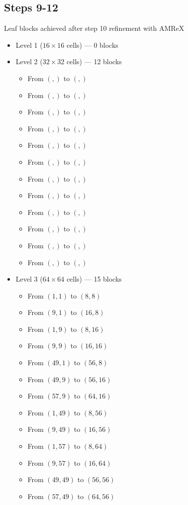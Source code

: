 \documentclass[12pt,letterpaper]{article}
\begin{document}
\subsection{Steps 9-12}
Leaf blocks achieved after step 10 refinement with AMReX
\begin{itemize}
\item{Level 1 ($16 \times 16$ cells) --- 0 blocks}
\item{Level 2 ($32 \times 32$ cells) --- 12 blocks}
    \begin{itemize}
    \item{From $(,)$ to $(,)$}
    \item{From $(,)$ to $(,)$}
    \item{From $(,)$ to $(,)$}
    \item{From $(,)$ to $(,)$}
    \item{From $(,)$ to $(,)$}
    \item{From $(,)$ to $(,)$}
    \item{From $(,)$ to $(,)$}
    \item{From $(,)$ to $(,)$}
    \item{From $(,)$ to $(,)$}
    \item{From $(,)$ to $(,)$}
    \item{From $(,)$ to $(,)$}
    \item{From $(,)$ to $(,)$}
    \end{itemize}
\item{Level 3 ($64 \times 64$ cells) --- 15 blocks}
    \begin{itemize}
    \item{From $(1, 1)$ to $( 8, 8)$}
    \item{From $(9, 1)$ to $(16, 8)$}
    \item{From $(1, 9)$ to $( 8,16)$}
    \item{From $(9, 9)$ to $(16,16)$}
    \item{From $(49,1)$ to $(56, 8)$}
    \item{From $(49,9)$ to $(56,16)$}
    \item{From $(57,9)$ to $(64,16)$}
    \item{From $(1,49)$ to $( 8,56)$}
    \item{From $(9,49)$ to $(16,56)$}
    \item{From $(1,57)$ to $( 8,64)$}
    \item{From $(9,57)$ to $(16,64)$}
    \item{From $(49,49)$ to $(56,56)$}
    \item{From $(57,49)$ to $(64,56)$}

\end{itemize}
\end{itemize}
\end{document}
